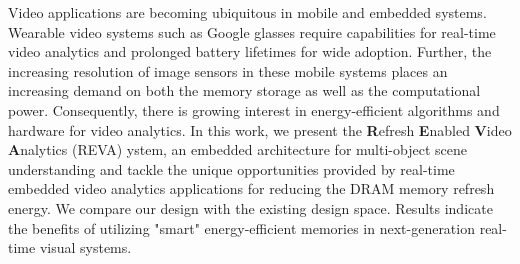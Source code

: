 Video applications are becoming ubiquitous in mobile and embedded systems. Wearable video systems such as Google glasses require capabilities for real-time video analytics and prolonged battery lifetimes for wide adoption. Further, the increasing resolution of image sensors in these mobile systems places an increasing demand on both the memory storage as well as the computational power. Consequently, there is growing interest in energy-efficient algorithms and hardware for video analytics. In this work, we present the \textbf{R}efresh \textbf{E}nabled \textbf{V}ideo \textbf{A}nalytics (REVA) ystem, an embedded architecture for multi-object scene understanding and tackle the unique opportunities provided by real-time embedded video analytics applications for reducing the DRAM memory refresh energy. We compare our design with the existing design space. Results indicate the benefits of utilizing "smart" energy-efficient memories in next-generation real-time visual systems. 
